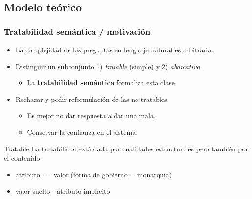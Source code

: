 \subsection{Modelo teórico}


\begin{frame}[<+->]
  \frametitle{Tratabilidad semántica / motivación}
      \begin{itemize}
          \item La complejidad de las preguntas en lenguaje natural es arbitraria.
          \item Distinguir un subconjunto 1) \textit{tratable} (simple) y 2) \textit{abarcativo}
          \begin{itemize}
            \item La {\color{blue}\textbf{tratabilidad semántica}} formaliza esta clase
          \end{itemize}
          \item Rechazar y pedir reformulación de las no tratables
          \begin{itemize}
            \item Es mejor no dar respuesta a dar una mala. 
            \item Conservar la confianza en el sistema.
          \end{itemize}
      \end{itemize}

    \begin{alertblock}{Tratable}
     La tratabilidad está dada por cualidades estructurales pero también por el contenido
      \begin{itemize}
          \item atributo $=$ valor (forma de gobierno = monarquía)
          \item valor suelto - atributo implícito 
      \end{itemize}

    \end{alertblock}
\end{frame}

